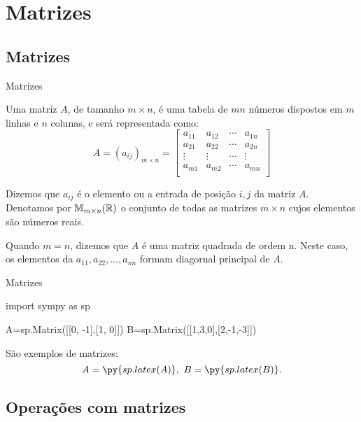\section{Matrizes}

\subsection*{Matrizes}

\begin{frame}[label=matrizes]{Matrizes}

Uma {\color{blue} matriz} $A$, de tamanho $m\times n$, é uma tabela de $mn$ números dispostos em $m$ linhas e $n$ colunas, e será representada como:
\[
A=(a_{ij})_{m\times n}=\left[\begin{array}{cccc}
 a_{11}  & a_{12}  & \cdots &  a_{1n}  \\
 a_{21} & a_{22}  & \cdots  & a_{2n} \\
 \vdots & \vdots & \cdots & \vdots \\
 a_{m1} & a_{m2}  & \cdots  & a_{mn} \\
\end{array}\right]
\]

Dizemos que $a_{ij}$ é o {\color{blue} elemento} ou a {\color{blue} entrada} de posição $i,j$ da matriz $A$. Denotamos por $\mathbb{M}_{m\times n}(\mathbb{R})$ o conjunto de todas as matrizes $m\times n$ cujos elementos são números reais.
\medskip

Quando $m=n$, dizemos que $A$ é uma {\color{blue} matriz quadrada de ordem n}. Neste caso, os elementos da $a_{11}, a_{22}, \ldots, a_{nn}$ formam {\color{blue}diagornal principal} de $A$.

\end{frame}

\begin{frame}[label=matrizes,fragile=singleslide]{Matrizes}
\begin{pycode}
import sympy as sp

A=sp.Matrix([[0, -1],[1, 0]])
B=sp.Matrix([[1,3,0],[2,-1,-3]])
\end{pycode}


\begin{exe} São exemplos de matrizes:
\[A=\py{sp.latex(A)},\ B=\py{sp.latex(B)}.\] 
\end{exe}


\end{frame}

\subsection*{Operações com matrizes}


